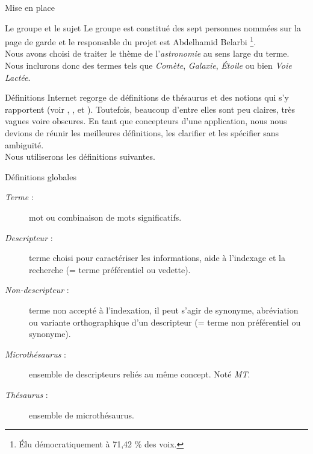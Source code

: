 \documentclass[a4paper, 12pt]{report}
\begin{document}
\begin{chapter}{Mise en place}
	\begin{section}{Le groupe et le sujet}
		Le groupe est constitué des sept personnes nommées sur la page de garde et le responsable du projet est Abdelhamid Belarbi
		\footnote{Élu démocratiquement à 71,42 \% des voix.}.\\
		Nous avons choisi de traiter le thème de l’\emph{astronomie} au sens large du terme. Nous inclurons donc des termes tels que \emph{Comète},
		\emph{Galaxie}, \emph{Étoile} ou bien \emph{Voie Lactée}.
	\end{section}
	
	\begin{section}{Définitions}\label{aspic}
		Internet regorge de définitions de thésaurus et des notions qui s’y rapportent (voir \cite{Wikipedia}, \cite{Inpes}, \cite{Bdsp} et \cite{Unesco}).
		Toutefois, beaucoup d’entre elles sont peu claires, très vagues voire obscures. En tant que concepteurs d’une application, nous nous devions de réunir les
		meilleures définitions, les clarifier et les spécifier sans ambiguïté.\\
		
		
		
		\noindent
		Nous utiliserons les définitions suivantes.
		\begin{subsection}{Définitions globales}
			\begin{description}
				\item[\emph{Terme} :] mot ou combinaison de mots significatifs.
				\item[\emph{Descripteur} :] terme choisi pour caractériser les informations, aide à l'indexage et la recherche (= terme préférentiel ou vedette).
				\item[\emph{Non-descripteur} :] terme non accepté à l'indexation, il peut s'agir de synonyme, abréviation ou variante orthographique d'un descripteur
				(= terme non préférentiel ou
				synonyme).
				\item[\emph{Microthésaurus} :] ensemble de descripteurs reliés au même concept. Noté \emph{MT}.
				\item[\emph{Thésaurus} :] ensemble de microthésaurus.
			\end{description}
		\end{subsection}
		

\end{section}
\end{chapter}
\end{document}
